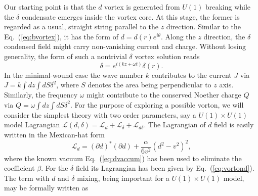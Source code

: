 \documentclass[12pt]{article}
\begin{document}
Our starting point is that the $d$ vortex is generated from $U(1)$ breaking while the $\delta$ condensate emerges 
inside the vortex core. At this stage, the former is regarded as a usual, straight string parallel to the
$z$ direction. Similar to the Eq.~(\ref{eq:bvortex}), it has the form of $d = d(r)e^{i\theta}$.
Along the $z$ direction, the $\delta$ condensed field might carry non-vanishing current and charge.
Without losing generality, the form of such a nontrivial $\delta$ vortex solution reads
\begin{equation}
  \label{eq:delta}
  \delta =  e^{i(kz+\omega t)}\delta(r).
\end{equation}
In the minimal-wound case the wave number $k$ contributes to the current $J$ via $J =k\int dz \int dS \delta^2$, where $S$ denotes the area being perpendicular to $z$ axis. Similarly, the frequency $\omega$ might contribute to the conserved
Noether charge $Q$ via $Q = \omega\int dz \int dS \delta^2$.
For the purpose of exploring a possible vorton, we will consider the simplest theory with two order parameters, say
a $U(1) \times U(1)$ model Lagrangian $\mathcal{L}(d,\delta)= \mathcal{L}_d +
\mathcal{L}_\delta + \mathcal{L}_{d\delta}$.
The Lagrangian of $d$ field is easily written in the Mexican-hat form
\begin{equation}
  \label{eq:vortonb}
  \mathcal{L}_d  = (\partial d)^* (\partial d) +\frac{\alpha}{6 v^2}(d^2 - v^2)^2,
\end{equation}
where the known vacuum Eq.~(\ref{eq:dvaccum}) has been used to eliminate the coefficient $\beta$.
For the $\delta$ field its Lagrangian has been given by Eq.~(\ref{eq:vortond}).
The term with $d$ and $\delta$ mixing, being important for a $U(1) \times U(1)$ model,  may be formally written as
\end{document}
